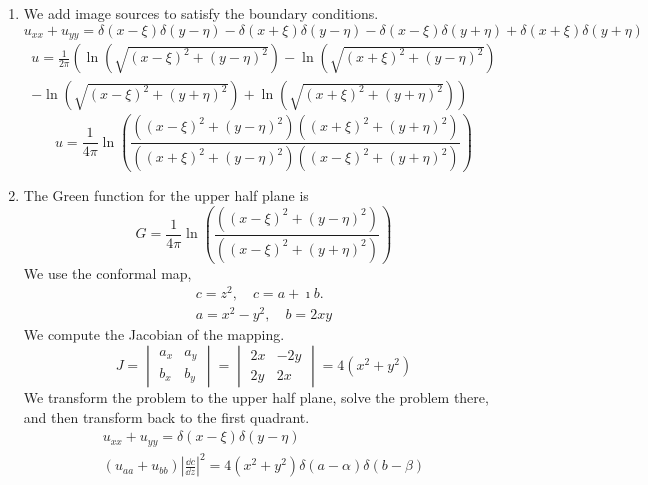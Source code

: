 {\begin{Solution}
  \begin{enumerate}
  \item 
    We add image sources to satisfy the boundary conditions.
    \[
    u_{x x}+u_{y y} = \delta(x-\xi) \delta(y-\eta) -  \delta(x+\xi) \delta(y-\eta) - \delta(x-\xi) \delta(y+\eta) + \delta(x+\xi) \delta(y+\eta)
    \]
    \begin{multline*}
      u = \frac{1}{2 \pi} \left( \ln \left( \sqrt{ (x-\xi)^2 + (y-\eta)^2 } \right)
        - \ln \left( \sqrt{ (x+\xi)^2 + (y-\eta)^2 } \right) \right.
      \\
      \left. - \ln \left( \sqrt{ (x-\xi)^2 + (y+\eta)^2 } \right)
        + \ln \left( \sqrt{ (x+\xi)^2 + (y+\eta)^2 } \right) \right)
    \end{multline*}
    \[
    \boxed{
      u = \frac{1}{4 \pi} \ln \left( 
        \frac{ \left((x-\xi)^2 + (y-\eta)^2 \right) \left((x+\xi)^2 + (y+\eta)^2 \right) }
        { \left((x+\xi)^2 + (y-\eta)^2 \right) \left((x-\xi)^2 + (y+\eta)^2 \right) }
      \right)
      }
    \]
  \item 
    The Green function for the upper half plane is
    \[
    G = \frac{1}{4 \pi} \ln \left( 
      \frac{ \left((x-\xi)^2 + (y-\eta)^2 \right) }{ \left((x-\xi)^2 + (y+\eta)^2 \right) }
    \right)
    \]
    We use the conformal map, 
    \begin{gather*}
      c = z^2, \quad c = a + \imath b.
      \\
      a = x^2 - y^2, \quad b = 2 x y
    \end{gather*}
    We compute the Jacobian of the mapping.
    \[
    J = 
    \begin{vmatrix}
      a_x & a_y \\
      b_x & b_y
    \end{vmatrix}
    = 
    \begin{vmatrix}
      2 x & - 2 y \\
      2 y & 2 x
    \end{vmatrix}
    =
    4 \left( x^2 + y^2 \right)
    \]
    We transform the problem to the upper half plane, solve the problem there, 
    and then transform back to the first quadrant.
    \begin{gather*}
      u_{x x} + u_{y y} = \delta(x-\xi) \delta(y-\eta)
      \\
      \left( u_{a a} + u_{b b} \right) \left| \frac{\dd c}{\dd z} \right|^2 
      = 4 \left( x^2 + y^2 \right) \delta(a - \alpha) \delta(b - \beta)
      \\

\end{gather*}
\end{enumerate}
\end{Solution}}
